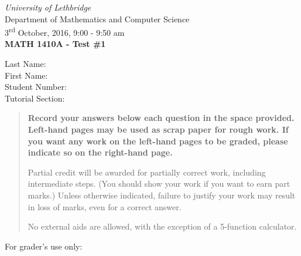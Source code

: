\documentclass[12pt]{article}
\newcommand{\skipline}{\vspace{12pt}}
\begin{document}
\author{Instructor: Sean Fitzpatrick}
\thispagestyle{plain}
\begin{center}
\emph{University of Lethbridge}\\
Department of Mathematics and Computer Science\\
3\textsuperscript{rd} October, 2016, 9:00 - 9:50 am\\
{\bf MATH 1410A - Test \#1}\\
\end{center}
\skipline \skipline \skipline \noindent \skipline
Last Name:\underline{\hspace{353pt}}\\
\skipline
First Name:\underline{\hspace{350pt}}\\
\skipline
Student Number:\underline{\hspace{323pt}}\\
\skipline
Tutorial Section: \underline{\hspace{320pt}}\\


\vspace{0.5in}


\begin{quote}
 {\bf Record your answers below each question in the space provided.    Left-hand pages may be used as scrap paper for rough work.  If you want any work on the left-hand pages to be graded, please indicate so on the right-hand page.
 
 \bigskip
 
Partial credit will be awarded for partially correct work, including intermediate steps. (You should show your work if you want to earn part marks.) Unless otherwise indicated, failure to justify your work may result in loss of marks, even for a correct answer. 

\bigskip

No external aids are allowed, with the exception of a 5-function calculator.}
\end{quote}


\vspace{0.5in}

For grader's use only:
\end{document}
